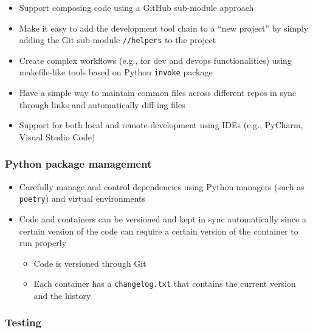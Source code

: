 \documentclass{article}
\begin{document}
\begin{itemize}

  \item Support composing code using a GitHub sub-module approach

  \item Make it easy to add the development tool chain to a ``new project'' by simply
    adding the Git sub-module \texttt{//helpers} to the project

  \item Create complex workflows (e.g., for dev and devops functionalities) using
    makefile-like tools based on Python \texttt{invoke} package

  \item Have a simple way to maintain common files across different repos in sync
    through links and automatically diff-ing files

  \item Support for both local and remote development using IDEs (e.g., PyCharm,
    Visual Studio Code)
\end{itemize}

\subsubsection{Python package management}
\label{python-package-management}

\begin{itemize}

  \item Carefully manage and control dependencies using Python managers (such as
    \texttt{poetry}) and virtual environments

  \item Code and containers can be versioned and kept in sync automatically since
    a certain version of the code can require a certain version of the container
    to run properly

    \begin{itemize}

      \item Code is versioned through Git

      \item Each container has a \texttt{changelog.txt} that contains the
        current version and the history
    \end{itemize}
\end{itemize}

\subsubsection{Testing}
\label{testing}
\end{document}
